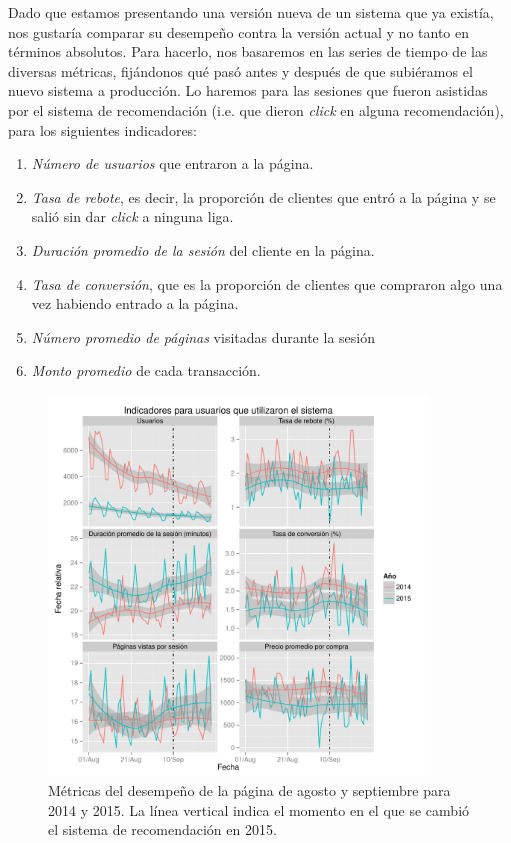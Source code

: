 \documentclass[12pt]{report}
\begin{document}
Dado que estamos presentando una versión nueva de un sistema que ya existía, nos gustaría comparar su desempeño contra la versión actual y no tanto en términos absolutos. Para hacerlo, nos basaremos en las series de tiempo de las diversas métricas, fijándonos qué pasó antes y después de que subiéramos el nuevo sistema a producción. Lo haremos para las sesiones que fueron asistidas por el sistema de recomendación (i.e. que dieron \emph{click} en alguna recomendación), para los siguientes indicadores:
\begin{enumerate}
	\item \emph{Número de usuarios} que entraron a la página.
	\item \emph{Tasa de rebote}, es decir, la proporción de clientes que entró a la página y se salió sin dar \emph{click} a ninguna liga.
	\item \emph{Duración promedio de la sesión} del cliente en la página.
	\item \emph{Tasa de conversión}, que es la proporción de clientes que compraron algo una vez habiendo entrado a la página.
	\item \emph{Número promedio de páginas} visitadas durante la sesión
	\item \emph{Monto promedio} de cada transacción.
\end{enumerate}

\begin{figure}[ht]
	\centering
	\includegraphics[width=0.9\textwidth]{imagenes/analytics_anios_x.pdf}
	\caption{\label{fig:analytics_x} Métricas del desempeño de la página de agosto y septiembre para 2014 y 2015. La línea vertical indica el momento en el que se cambió el sistema de recomendación en 2015.}
\end{figure}
\end{document}
